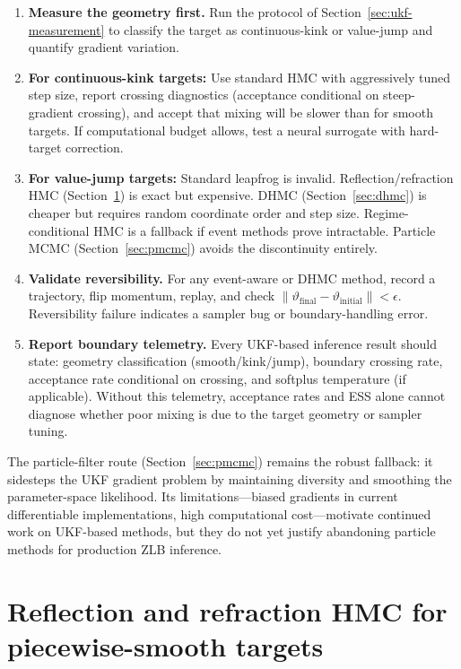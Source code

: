 \documentclass[11pt]{article}
\begin{document}
\begin{enumerate}
\item \textbf{Measure the geometry first.} Run the protocol of
      Section~\ref{sec:ukf-measurement} to classify the target as
      continuous-kink or value-jump and quantify gradient variation.
\item \textbf{For continuous-kink targets:} Use standard HMC with
      aggressively tuned step size, report crossing diagnostics (acceptance
      conditional on steep-gradient crossing), and accept that mixing will be
      slower than for smooth targets. If computational budget allows, test a
      neural surrogate with hard-target correction.
\item \textbf{For value-jump targets:} Standard leapfrog is invalid.
      Reflection/refraction HMC (Section~\ref{sec:event}) is exact but
      expensive. DHMC (Section~\ref{sec:dhmc}) is cheaper but requires random
      coordinate order and step size. Regime-conditional HMC is a fallback if
      event methods prove intractable. Particle MCMC (Section~\ref{sec:pmcmc})
      avoids the discontinuity entirely.
\item \textbf{Validate reversibility.} For any event-aware or DHMC method,
      record a trajectory, flip momentum, replay, and check
      $\|\vartheta_{\text{final}} - \vartheta_{\text{initial}}\| < \epsilon$.
      Reversibility failure indicates a sampler bug or boundary-handling error.
\item \textbf{Report boundary telemetry.} Every UKF-based inference result
      should state: geometry classification (smooth/kink/jump), boundary
      crossing rate, acceptance rate conditional on crossing, and softplus
      temperature (if applicable). Without this telemetry, acceptance rates and
      ESS alone cannot diagnose whether poor mixing is due to the target
      geometry or sampler tuning.
\end{enumerate}

The particle-filter route (Section~\ref{sec:pmcmc}) remains the robust
fallback: it sidesteps the UKF gradient problem by maintaining diversity and
smoothing the parameter-space likelihood. Its limitations—biased gradients in
current differentiable implementations, high computational cost—motivate
continued work on UKF-based methods, but they do not yet justify abandoning
particle methods for production ZLB inference.

\section{Reflection and refraction HMC for piecewise-smooth targets}\label{sec:event}
\end{document}
